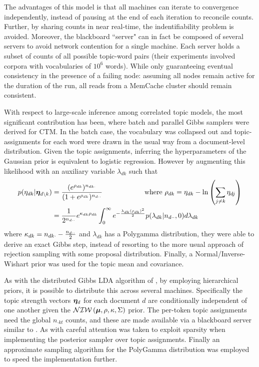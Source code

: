 The advantages of this model is that all machines can iterate to convergence independently, instead of pausing at the end of each iteration to reconcile counts. Further, by sharing counts in near real-time, the indentifiability problem is avoided. Moreover, the blackboard ``server" can in fact be composed of several servers to avoid network contention for a single machine. Each server holds a subset of counts of all possible topic-word pairs (their experiments involved corpora with vocabularies of $10^6$ words). While only guaranteeing eventual consistency in the presence of a failing node: assuming all nodes remain active for the duration of the run, all reads from a MemCache cluster should remain consistent. 

With respect to large-scale inference among correlated topic models, the most significant contribution has been\cite{Chen2013}, where batch and parallel Gibbs samplers were derived for CTM. In the batch case, the  vocabulary was collapsed out and topic-assignments for each word were drawn in the usual way from a document-level distribution. Given the topic assignments, inferring the hyperparameters of the Gaussian prior is equivalent to logistic regression. However by augmenting this likelihood with an auxiliary variable $\lambda_{dk}$ such that
\begin{align}
p(\eta_{dk} | \bm \eta_{d\setminus k}) & = \frac{(e^{\rho_{dk}})^{n_{dk\cdot}}}{(1 + e^{\rho_{dk}})^{n_{d\cdot\cdot}}} \qquad\qquad\qquad\text{where }\rho_{dk} = \eta_{dk} - \ln\left(\sum_{j \neq k} \eta_{dj}\right) \\
&= \frac{1}{2^{n_{d\cdot\cdot}}}
e^{\kappa_{dk} \rho_{dk}}
\int_0^\infty e^{-\frac{\lambda_{dk} (\rho_{dk})^2}{2}} p(\lambda_{dk}|n_{d\cdot\cdot},0) d\lambda_{dk} 
\end{align}
where $\kappa_{dk} = n_{dk\cdot} - \frac{n_{d\cdot\cdot}}{2}$ and $\lambda_{dk}$ has a Polygamma distribution, they were able to derive an exact Gibbs step, instead of resorting to the more usual approach of rejection sampling with some proposal distribution. Finally, a Normal/Inverse-Wishart prior was used for the topic mean and covariance.

As with the distributed Gibbs LDA algorithm of \cite{Newman2009}, by employing hierarchical priors, it is possible to distribute this across several machines. Specifically the topic strength vectors $\bm \eta_d$ for each document $d$ are conditionally independent of one another given the $\mathcal{NIW}\left(\bm \mu, \rho, \kappa, \Sigma\right)$ prior. The per-token topic assignments need the global $n_{\cdot k t}$ counts, and these are made available via a blackboard server similar to \cite{Smola2010}. As with \cite{Yao2009} careful attention was taken to exploit sparsity when implementing the posterior sampler over topic assignments. Finally an approximate sampling algorithm for the PolyGamma distribution was employed to speed the implementation further.









